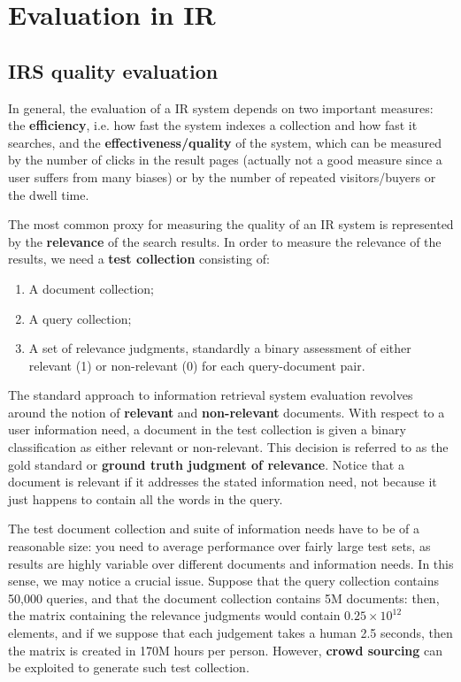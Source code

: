 \section{Evaluation in IR}\label{ch9}
\subsection{IRS quality evaluation}
In general, the evaluation of a IR system depends on two important measures: the \textbf{efficiency}, i.e. how fast the system indexes a collection and how fast it searches, and the \textbf{effectiveness/quality} of the system, which can be measured by the number of clicks in the result pages (actually not a good measure since a user suffers from many biases) or by the number of repeated visitors/buyers or the dwell time.

The most common proxy for measuring the quality of an IR system is represented by the \textbf{relevance} of the search results. In order to measure the relevance of the results, we need a \textbf{test collection} consisting of:

\begin{enumerate}
    \item A document collection;
    \item A query collection;
    \item A set of relevance judgments, standardly a binary assessment of either relevant (1) or non-relevant (0) for each query-document pair.
\end{enumerate}

The standard approach to information retrieval system evaluation revolves around the notion of \textbf{relevant} and \textbf{non-relevant} documents. With respect to a user information need, a document in the test collection is given a binary classification as either relevant or non-relevant. This decision is referred to as the gold standard or \textbf{ground truth judgment of relevance}. Notice that a document is relevant if it addresses the stated information need, not because it just happens to contain all the words in the query. 

The test document collection and suite of information needs have to be of a reasonable size: you need to average performance over fairly large test sets, as results are highly variable over different documents and information needs. In this sense, we may notice a crucial issue. Suppose that the query collection contains 50,000 queries, and that the document collection contains 5M documents: then, the matrix containing the relevance judgments would contain $0.25 \times 10^{12}$ elements, and if we suppose that each judgement takes a human 2.5 seconds, then the matrix is created in 170M hours per person. However, \textbf{crowd sourcing} can be exploited to generate such test collection.


